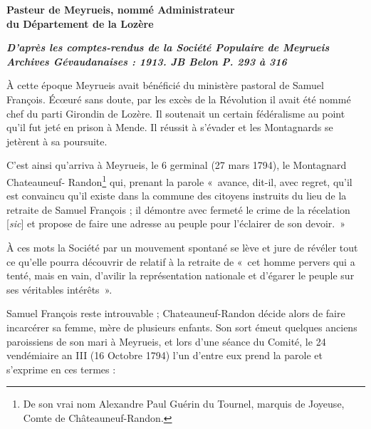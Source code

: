 

\begin{center}

\vspace{0.45em}

{\large\bfseries Pasteur de Meyrueis, nommé Administrateur\\
du Département de la Lozère}

\vspace{0.45em}

{\small\bfseries\itshape
D’après les comptes-rendus de la Société Populaire de Meyrueis\\
Archives Gévaudanaises : 1913. JB Belon P. 293 à 316}
\end{center}

\vspace{0.7em}

À cette époque Meyrueis avait bénéficié du ministère pastoral de Samuel François.
Écœuré sans doute, par les excès de la Révolution il avait été nommé chef du parti Girondin de
Lozère. Il soutenait un certain fédéralisme au point qu’il fut jeté en prison à Mende. Il réussit
à s’évader et les Montagnards se jetèrent à sa poursuite.

C’est ainsi qu’arriva à Meyrueis, le 6 germinal (27 mars 1794), le Montagnard Chateauneuf-
Randon\footnote{De son vrai nom Alexandre Paul Guérin du Tournel, marquis de Joyeuse, Comte de Châteauneuf-Randon.} qui, prenant la parole «~avance, dit-il, avec regret, qu’il est convaincu qu’il existe
dans la commune des citoyens instruits du lieu de la retraite de Samuel François ; il démontre
avec fermeté le crime de la récelation [\textit{sic}] et propose de faire une adresse au peuple pour
l’éclairer de son devoir.~»

À ces mots la Société par un mouvement spontané se lève et jure de révéler tout ce qu’elle
pourra découvrir de relatif à la retraite de «~cet homme pervers qui a tenté, mais en vain,
d’avilir la représentation nationale et d’égarer le peuple sur ses véritables intérêts~».

Samuel François reste introuvable ; Chateauneuf-Randon décide alors de faire incarcérer sa
femme, mère de plusieurs enfants. Son sort émeut quelques anciens paroissiens de son mari à
Meyrueis, et lors d’une séance du Comité, le 24 vendémiaire an III (16 Octobre 1794) l’un
d’entre eux prend la parole et s’exprime en ces termes :

